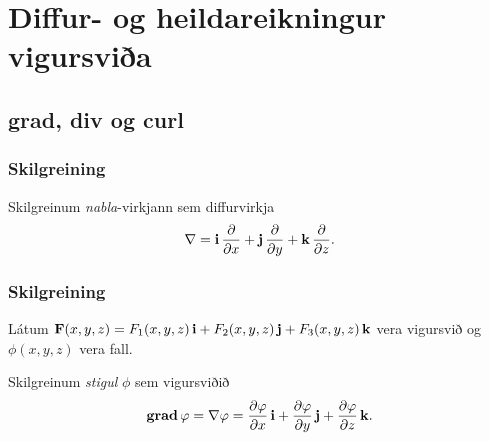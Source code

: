 
\theoremstyle{definition}
\newtheorem{exercise}[theorem]{}





\newbox\mytempbox
\newdimen\mytempdimen

\newcommand\includegraphicscopyright[3][]{%
  \leavevmode\vbox{\vskip3pt\raggedright\setbox\mytempbox=\hbox{\texttt{[image: \#2]}}%
    \mytempdimen=\wd\mytempbox\box\mytempbox\par\vskip1pt%
    \fontsize{3}{3.5}\selectfont{\color{black!25}{\vbox{\hsize=\mytempdimen#3}}}\vskip3pt%
}}

\newenvironment{colortabular}[1]{\medskip\rowcolors[]{1}{blue!20}{blue!10}\tabular{#1}\rowcolor{blue!40}}{\endtabular\medskip}

\def\equad{\leavevmode\hbox{}\quad}

\newenvironment{greencolortabular}[1]
{\medskip\rowcolors[]{1}{green!50!black!20}{green!50!black!10}%
  \tabular{#1}\rowcolor{green!50!black!40}}%
{\endtabular\medskip}





\section{Diffur- og heildareikningur vigursviða}

\subsection{grad, div og curl} 

\subsubsection{Skilgreining \rtask{}}
 Skilgreinum {\em nabla}-virkjann sem diffurvirkja
$$\nabla=\mbox{${\bf i}$}\,\frac{\partial}{\partial x}+\mbox{${\bf j}$}\,\frac{\partial}{\partial y}+\mbox{${\bf k}$}\,\frac{\partial}{\partial z}.$$



\subsubsection{Skilgreining \rtask{}}
 Látum
$\mbox{${\bf F}$}(x,y,z)=F_1(x,y,z)\,\mbox{${\bf i}$}+F_2(x,y,z)\,\mbox{${\bf j}$}+F_3(x,y,z)\,\mbox{${\bf k}$}$ vera
vigursvið og $\phi(x,y,z)$ vera fall. 

Skilgreinum  {\em stigul} $\phi$ sem vigursviðið 
$$\mbox{${\rm\bf grad\,}$} \varphi=\nabla\varphi=\frac{\partial \varphi}{\partial x}\,\mbox{${\bf i}$}+
\frac{\partial \varphi}{\partial y}\,\mbox{${\bf j}$}+\frac{\partial \varphi}{\partial z}\,\mbox{${\bf k}$}.$$

